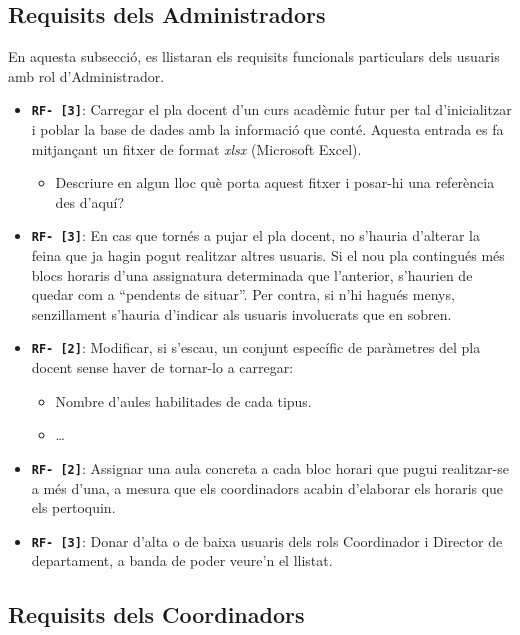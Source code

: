 \documentclass[a4paper,12pt]{ThesisStyle}
\begin{document}
\subsection{Requisits dels Administradors}
\label{subsec:requisits_administradors}

En aquesta subsecció, es llistaran els requisits funcionals particulars dels usuaris amb rol d'Administrador.

\begin{itemize}
  \item \texttt{\textbf{RF- [3]}}: Carregar el pla docent d'un curs acadèmic futur per tal d'inicialitzar i poblar la base de dades amb la informació que conté. Aquesta entrada es fa mitjançant un fitxer de format \emph{xlsx} (Microsoft Excel).
    \begin{itemize}
      \item Descriure en algun lloc què porta aquest fitxer i posar-hi una referència des d'aquí?
    \end{itemize}
  \item \texttt{\textbf{RF- [3]}}: En cas que tornés a pujar el pla docent, no s'hauria d'alterar la feina que ja hagin pogut realitzar altres usuaris. Si el nou pla contingués més blocs horaris d'una assignatura determinada que l'anterior, s'haurien de quedar com a ``pendents de situar''. Per contra, si n'hi hagués menys, senzillament s'hauria d'indicar als usuaris involucrats que en sobren.
  \item \texttt{\textbf{RF- [2]}}: Modificar, si s'escau, un conjunt específic de paràmetres del pla docent sense haver de tornar-lo a carregar:
    \begin{itemize}
      \item Nombre d'aules habilitades de cada tipus.
      \item \ldots
    \end{itemize}
  \item \texttt{\textbf{RF- [2]}}: Assignar una aula concreta a cada bloc horari que pugui realitzar-se a més d'una, a mesura que els coordinadors acabin d'elaborar els horaris que els pertoquin.
  \item \texttt{\textbf{RF- [3]}}: Donar d'alta o de baixa usuaris dels rols Coordinador i Director de departament, a banda de poder veure'n el llistat.
\end{itemize}

\subsection{Requisits dels Coordinadors}
\label{subsec:requisits_coordinadors}
\end{document}
